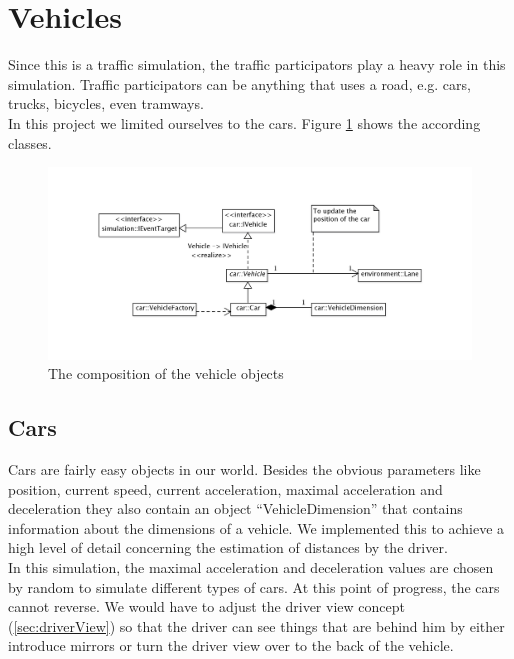
\section{Vehicles}
\label{sec:vehicles}

Since this is a traffic simulation, the traffic participators play a
heavy role in this simulation. Traffic participators can be anything
that uses a road, e.g.  cars, trucks, bicycles, even tramways. \\

\noindent In this project we limited ourselves to the cars. Figure 
\ref{fig:vehicles} shows the according classes. \\

\begin{figure}[H]
\begin{center}
\includegraphics[width=\textwidth]{images/vehicles.png}
\end{center}
\caption{The composition of the vehicle objects}
\label{fig:vehicles}
\end{figure}

\subsection{Cars}

Cars are fairly easy objects in our world. Besides the obvious parameters
like position, current speed, current acceleration, maximal acceleration
and deceleration they also contain an object ``VehicleDimension'' that
contains information about the dimensions of a vehicle. We implemented this
to achieve a high level of detail concerning the estimation of distances
by the driver. \\

In this simulation, the maximal acceleration and deceleration values
are chosen by random to simulate different types of cars. At this point of 
progress, the cars cannot reverse. We would have to adjust the driver view 
concept (\ref{sec:driverView}) so that the driver can see things that are
behind him by either introduce mirrors or turn the driver view over to the
back of the vehicle.

